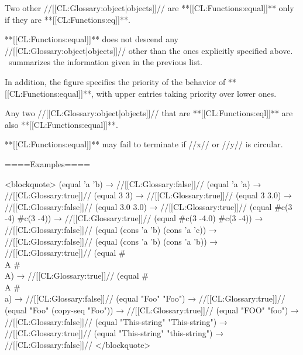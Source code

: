 
Two other //[[CL:Glossary:object|objects]]// are **[[CL:Functions:equal]]** only if they are **[[CL:Functions:eq]]**.

\endlist

**[[CL:Functions:equal]]** does not descend any //[[CL:Glossary:object|objects]]// other than the ones explicitly specified above. \Thenextfigure\ summarizes the information given in the previous list.

In addition, the figure specifies the priority of the behavior of **[[CL:Functions:equal]]**, with upper entries taking priority over lower ones.


Any two //[[CL:Glossary:object|objects]]// that are **[[CL:Functions:eql]]** are also **[[CL:Functions:equal]]**.

**[[CL:Functions:equal]]** may fail to terminate if //x// or //y// is circular.

====Examples====

<blockquote> (equal 'a 'b) → //[[CL:Glossary:false]]// (equal 'a 'a) → //[[CL:Glossary:true]]// (equal 3 3) → //[[CL:Glossary:true]]// (equal 3 3.0) → //[[CL:Glossary:false]]// (equal 3.0 3.0) → //[[CL:Glossary:true]]// (equal #c(3 -4) #c(3 -4)) → //[[CL:Glossary:true]]// (equal #c(3 -4.0) #c(3 -4)) → //[[CL:Glossary:false]]// (equal (cons 'a 'b) (cons 'a 'c)) → //[[CL:Glossary:false]]// (equal (cons 'a 'b) (cons 'a 'b)) → //[[CL:Glossary:true]]// (equal #\\A #\\A) → //[[CL:Glossary:true]]// (equal #\\A #\\a) → //[[CL:Glossary:false]]// (equal "Foo" "Foo") → //[[CL:Glossary:true]]// (equal "Foo" (copy-seq "Foo")) → //[[CL:Glossary:true]]// (equal "FOO" "foo") → //[[CL:Glossary:false]]// (equal "This-string" "This-string") → //[[CL:Glossary:true]]// (equal "This-string" "this-string") → //[[CL:Glossary:false]]// </blockquote>

